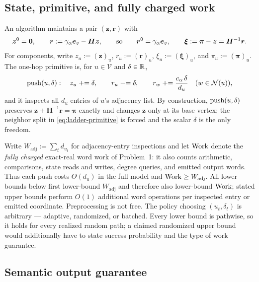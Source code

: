 \subsection*{State, primitive, and fully charged work}

An algorithm maintains a pair $(\bm{z},\bm{r})$ with
\begin{equation}
    \bm{z}^{0}=\bm{0},
    \qquad
    \bm{r}:=\gamma_{\alpha}\bm{e}_{v}-\bm{H}\bm{z},
    \qquad\text{so}\qquad
    \bm{r}^{0}=\gamma_{\alpha}\bm{e}_{v},
    \qquad
    \bm{\xi}:=\bm{\pi}-\bm{z}=\bm{H}^{-1}\bm{r} .
    \label{eq:ladder-state}
\end{equation}
For components, write $z_u:=(\bm{z})_u$, $r_u:=(\bm{r})_u$,
$\xi_u:=(\bm{\xi})_u$, and $\pi_u:=(\bm{\pi})_u$. The one-hop primitive is, for
$u\in\mathcal{V}$ and $\delta\in\mathbb{R}$,
\begin{equation}
    \operatorname{push}(u,\delta):\quad
    z_{u}\mathrel{+}=\delta,
    \qquad
    r_{u}\mathrel{-}=\delta,
    \qquad
    r_{w}\mathrel{+}=\frac{c_{\alpha}\,\delta}{d_{u}}
    \quad(w\in\mathcal N(u)),
    \label{eq:ladder-primitive}
\end{equation}
and it inspects all $d_u$ entries of $u$'s adjacency list. By construction,
$\operatorname{push}(u,\delta)$ preserves
$\bm{z}+\bm{H}^{-1}\bm{r}=\bm{\pi}$ exactly and changes $\bm{z}$ only at its
base vertex; the neighbor split in \eqref{eq:ladder-primitive} is forced and
the scalar $\delta$ is the only freedom.

Write $W_{\mathrm{adj}}:=\sum_t d_{u_t}$ for adjacency-entry inspections and
let $\operatorname{Work}$ denote the \emph{fully charged} exact-real word work of Problem~1:
it also counts arithmetic, comparisons, state reads and writes, degree
queries, and emitted output words. Thus each push costs $\Theta(d_u)$ in the
full model and $\operatorname{Work}\ge W_{\mathrm{adj}}$. All lower bounds below first
lower-bound $W_{\mathrm{adj}}$ and therefore also lower-bound $\operatorname{Work}$; stated
upper bounds perform $O(1)$ additional word operations per inspected entry or
emitted coordinate. Preprocessing is not free. The policy choosing
$(u_t,\delta_t)$ is arbitrary --- adaptive, randomized, or batched. Every
lower bound is pathwise, so it holds for every realized random path; a claimed
randomized upper bound would additionally have to state success probability
and the type of work guarantee.

\subsection*{Semantic output guarantee}

